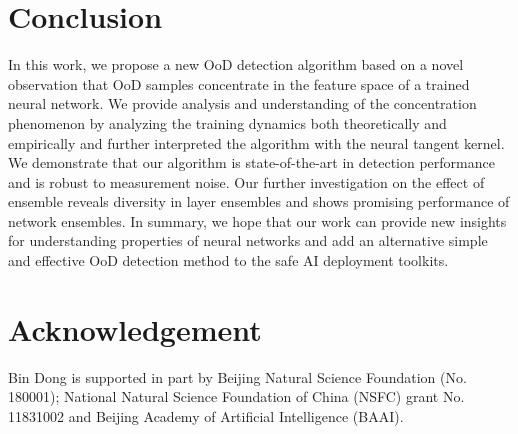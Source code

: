 \documentclass[letterpaper]{article}
\begin{document}
\section{Conclusion}
In this work, we propose a new OoD detection algorithm based on a novel observation that OoD samples concentrate in the feature space of a trained neural network.
We provide analysis and understanding of the concentration phenomenon by analyzing the training dynamics both theoretically and empirically and further interpreted the algorithm with the neural tangent kernel.
We demonstrate that our algorithm is state-of-the-art in detection performance and is robust to measurement noise. Our further investigation on the effect of ensemble reveals diversity in layer ensembles and shows promising performance of network ensembles.
In summary, we hope that our work can provide new insights for understanding properties of neural networks and add an alternative simple and effective OoD detection method to the safe AI deployment toolkits.


\section*{Acknowledgement}
Bin Dong is supported in part by Beijing Natural Science Foundation (No. 180001); National Natural Science Foundation of China (NSFC) grant No. 11831002 and Beijing Academy of Artificial Intelligence (BAAI).


\end{document}
